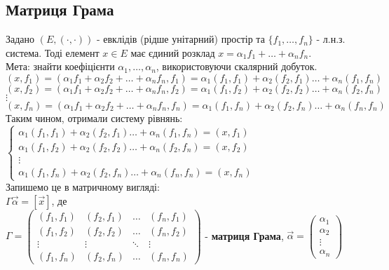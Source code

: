 \documentclass[a4paper, 10pt]{article}
\theoremstyle{theoremdd}
\begin{document}
\subsection{Матриця Грама}
Задано $(E,(\cdot,\cdot))$ - евклідів (рідше унітарний) простір та $\{f_1,\dots,f_n\}$ - л.н.з. система. Тоді елемент $x \in E$ має єдиний розклад $x = \alpha_1 f_1 + \dots + \alpha_n f_n$.\\
Мета: знайти коефіцієнти $\alpha_1,\dots,\alpha_n$, використовуючи скалярний добуток.\\
$(x,f_1) = (\alpha_1 f_1 + \alpha_2 f_2 + \dots + \alpha_n f_n, f_1) = \alpha_1 (f_1,f_1) + \alpha_2 (f_2,f_1) \dots + \alpha_n (f_1,f_n)$\\
$(x,f_2) = (\alpha_1 f_1 + \alpha_2 f_2 + \dots + \alpha_n f_n, f_2) = \alpha_1 (f_1,f_2) + \alpha_2 (f_2,f_2) \dots + \alpha_n (f_2,f_n)$\\
$\vdots$\\
$(x,f_n) = (\alpha_1 f_1 + \alpha_2 f_2 + \dots + \alpha_n f_n, f_n) = \alpha_1 (f_1,f_n) + \alpha_2 (f_2,f_n) \dots + \alpha_n (f_n,f_n)$\\
Таким чином, отримали систему рівнянь:\\
$\begin{cases}
\alpha_1 (f_1,f_1) + \alpha_2 (f_2,f_1) \dots + \alpha_n (f_1,f_n) = (x,f_1) \\
\alpha_1 (f_1,f_2) + \alpha_2 (f_2,f_2) \dots + \alpha_n (f_2,f_n) = (x,f_2) \\
\vdots \\
\alpha_1 (f_1,f_n) + \alpha_2 (f_2,f_n) \dots + \alpha_n (f_n,f_n) = (x,f_n)
\end{cases}$\\
Запишемо це в матричному вигляді:\\
$\Gamma \vec{\alpha} = [\vec{x}]$, де\\
$\Gamma = \begin{pmatrix}
(f_1,f_1) & (f_2,f_1) & \dots & (f_n,f_1) \\
(f_1,f_2) & (f_2,f_2) & \dots & (f_n,f_2) \\
\vdots & \vdots & \ddots & \vdots \\
(f_1,f_n) & (f_2,f_n) & \dots & (f_n,f_n)
\end{pmatrix}$ - \textbf{матриця Грама}, \hspace{0.5cm}
$\vec{\alpha} = \begin{pmatrix}
\alpha_1 \\ \alpha_2 \\ \vdots \\ \alpha_n
\end{pmatrix}$ \hspace{1cm}
\end{document}
